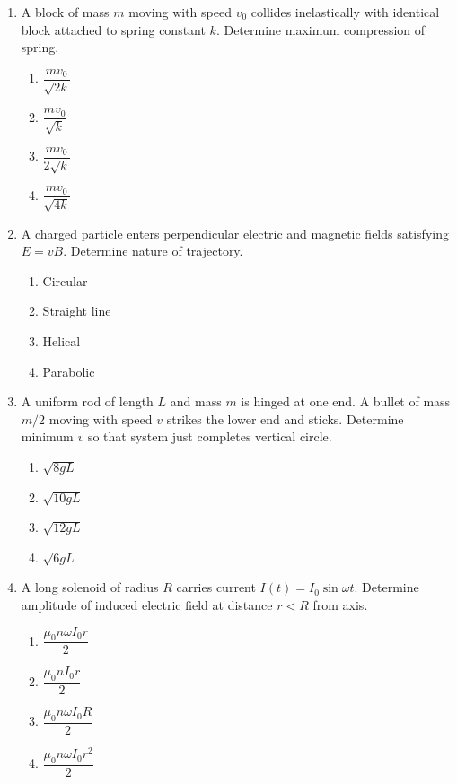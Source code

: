 \documentclass[12pt]{article}
\begin{document}
\begin{enumerate}
\item A block of mass $m$ moving with speed $v_0$ collides inelastically with identical block attached to spring constant $k$. Determine maximum compression of spring.

\begin{enumerate}
\item $\dfrac{mv_0}{\sqrt{2k}}$
\item $\dfrac{mv_0}{\sqrt{k}}$
\item $\dfrac{mv_0}{2\sqrt{k}}$
\item $\dfrac{mv_0}{\sqrt{4k}}$
\end{enumerate}

\item A charged particle enters perpendicular electric and magnetic fields satisfying $E=vB$. Determine nature of trajectory.

\begin{enumerate}
\item Circular
\item Straight line
\item Helical
\item Parabolic
\end{enumerate}

\item A uniform rod of length $L$ and mass $m$ is hinged at one end. A bullet of mass $m/2$ moving with speed $v$ strikes the lower end and sticks. Determine minimum $v$ so that system just completes vertical circle.

\begin{enumerate}
\item $\sqrt{8gL}$
\item $\sqrt{10gL}$
\item $\sqrt{12gL}$
\item $\sqrt{6gL}$
\end{enumerate}

\item A long solenoid of radius $R$ carries current $I(t)=I_0\sin\omega t$. Determine amplitude of induced electric field at distance $r<R$ from axis.

\begin{enumerate}
\item $\dfrac{\mu_0 n\omega I_0 r}{2}$
\item $\dfrac{\mu_0 n I_0 r}{2}$
\item $\dfrac{\mu_0 n\omega I_0 R}{2}$
\item $\dfrac{\mu_0 n\omega I_0 r^2}{2}$
\end{enumerate}

\end{enumerate}
\end{document}
